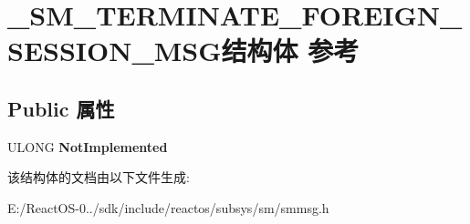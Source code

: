 \hypertarget{struct___s_m___t_e_r_m_i_n_a_t_e___f_o_r_e_i_g_n___s_e_s_s_i_o_n___m_s_g}{}\section{\+\_\+\+S\+M\+\_\+\+T\+E\+R\+M\+I\+N\+A\+T\+E\+\_\+\+F\+O\+R\+E\+I\+G\+N\+\_\+\+S\+E\+S\+S\+I\+O\+N\+\_\+\+M\+S\+G结构体 参考}
\label{struct___s_m___t_e_r_m_i_n_a_t_e___f_o_r_e_i_g_n___s_e_s_s_i_o_n___m_s_g}
\subsection*{Public 属性}
\begin{DoxyCompactItemize}
\item 
\mbox{\label{struct___s_m___t_e_r_m_i_n_a_t_e___f_o_r_e_i_g_n___s_e_s_s_i_o_n___m_s_g_aeb549a56ac5b83ea1264a3d356c4888e}} 
U\+L\+O\+NG {\bfseries Not\+Implemented}
\end{DoxyCompactItemize}


该结构体的文档由以下文件生成\+:\begin{DoxyCompactItemize}
\item 
E\+:/\+React\+O\+S-\/0../sdk/include/reactos/subsys/sm/smmsg.\+h\end{DoxyCompactItemize}

